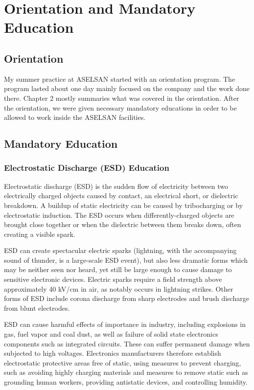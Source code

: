 \vfill

\section{Orientation and Mandatory Education}

\subsection{Orientation}
\- \indent
	My summer practice at ASELSAN started with an orientation program. The program lasted about one day mainly focused on the company and the work done there. Chapter 2 mostly summaries what was covered in the orientation. After the orientation, we were given necessary mandatory educations in order to be allowed to work inside the ASELSAN facilities.  

\subsection{Mandatory Education}
\- \indent
		
	
	
\subsubsection{Electrostatic Discharge (ESD) Education }
\- \indent
	Electrostatic discharge (ESD) is the sudden flow of electricity between two electrically charged objects caused by contact, an electrical short, or dielectric breakdown. A buildup of static electricity can be caused by tribocharging or by electrostatic induction. The ESD occurs when differently-charged objects are brought close together or when the dielectric between them breaks down, often creating a visible spark.

	ESD can create spectacular electric sparks (lightning, with the accompanying sound of thunder, is a large-scale ESD event), but also less dramatic forms which may be neither seen nor heard, yet still be large enough to cause damage to sensitive electronic devices. Electric sparks require a field strength above approximately 40 kV/cm in air, as notably occurs in lightning strikes. Other forms of ESD include corona discharge from sharp electrodes and brush discharge from blunt electrodes.

	ESD can cause harmful effects of importance in industry, including explosions in gas, fuel vapor and coal dust, as well as failure of solid state electronics components such as integrated circuits. These can suffer permanent damage when subjected to high voltages. Electronics manufacturers therefore establish electrostatic protective areas free of static, using measures to prevent charging, such as avoiding highly charging materials and measures to remove static such as grounding human workers, providing antistatic devices, and controlling humidity.

